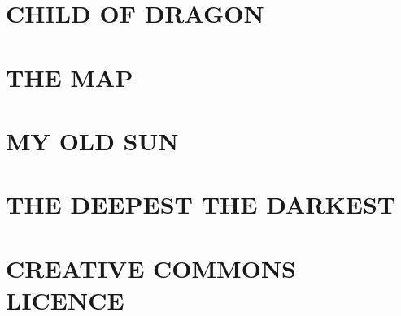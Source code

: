 \documentclass[11pt,twoside,openright]{scrbook}
\begin{document}
\section{CHILD OF DRAGON}
\thispagestyle{empty}
\cleardoublepage

\cleardoublepage

\section{THE MAP}
\thispagestyle{empty}
\cleardoublepage

\cleardoublepage

\section{MY OLD SUN}
\thispagestyle{empty}
\cleardoublepage


\section{THE DEEPEST THE DARKEST}
\thispagestyle{empty}
\cleardoublepage

\cleardoublepage

\pagestyle{plain}
\section*{CREATIVE COMMONS LICENCE}
\thispagestyle{empty}
\cleardoublepage


\thispagestyle{empty}
\newpage
\mbox{}
\thispagestyle{empty}
\newpage
\mbox{}
\thispagestyle{empty}
\newpage
\end{document}
